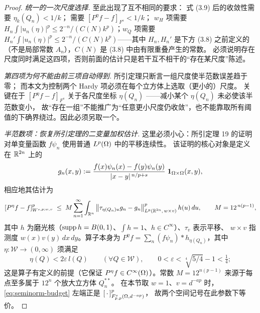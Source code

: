 \begin{proof}
\emph{统一的一次尺度选择.}
至此出现了互不相同的要求：
式 (3.9) 后的收敛性需要 $\eta_k(Q_n)<1/k$；
需要 $[P^{\eta}f-f]_{F^s}<1/k$；
$w_H$ 项需要 $H_n\int|u_n(\eta)|^p\le 2^{-n}/(C(N)k^{p})$；$w_Q$ 项需要 $H_n'\int|u_n(\eta)|^p\le 2^{-n}/(C(N)k^{p})$——其中 $H_n,H_n'$ 是下方 (3.8) 之前定义的（不是局部常数 $A_n$），$C(N)$ 是 (3.8) 中由有限重叠产生的常数。
必须说明存在尺度同时满足这四项，否则前面的估计只是若干互不相干的“存在某尺度”陈述。

\emph{第四项为何不能由前三项自动得到.}
所引定理只断言一组尺度使半范数误差趋于零；
而本文为控制两个 Hardy 项必须在每个立方体上选取（更小的）尺度。
关键在于 $[P^{\eta}f-f]_{F^s}$ 关于各尺度坐标 $\eta(Q_n)$ ——减小某个 $\eta(Q_n)$ 未必使该半范数变小，
故“存在一组”不能推广为“任意更小尺度仍收敛”，也不能靠取所有阈值的下确界绕过。因此必须另取一个。

\emph{半范数项：恢复所引定理的二变量加权估计.}
这里必须小心：所引定理 19 的证明对单变量函数 $f\psi_n$ 使用普通 $L^p(\Omega)$ 中的平移连续性。
该证明的核心对象是定义在 $\mathbb{R}^{2n}$ 上的
\begin{equation}\label{eq:gn-def}
  g_n(x,y):=\frac{f(x)\psi_n(x)-f(y)\psi_n(y)}{|x-y|^{\,n/p+s}}\;\mathbf 1_{\Omega\times\Omega}(x,y),
\end{equation}
相应地其估计为
\begin{equation}\label{eq:seminorm-budget}
  [P^{\eta}f-f]_{W^{s,p;w,v}}^{p}
  \;\le\;M\sum_{n=1}^{\infty}\int_{\mathbb{R}^n}
  \big\|\tau_{\eta(Q_n)u}g_n-g_n\big\|_{L^p(\mathbb{R}^{2n},\,w\times v)}^{p}\,h(u)\,du ,
  \qquad M=12^{\,n(p-1)},
\end{equation}
其中 $h$ 为磨光核（$\operatorname{supp} h=B(0,1)$、$\int h=1$、$h\in C^\infty$）、$\tau_v$ 表示平移、
$w\times v$ 指测度 $w(x)v(y)\,dx\,dy$。算子本身为
$P^{\eta}f=\sum_{n}(f\psi_n)*h_{\eta(Q_n)}$，其中 $\eta:\mathcal W\to(0,\infty)$ 须满足
\begin{equation}\label{eq:eta-admissible}
  \eta(Q)<2\varepsilon\,l(Q)\qquad(\forall Q\in\mathcal W),\qquad 0<\varepsilon<\sqrt[4]{5/4}-1<\tfrac14 ;
\end{equation}
这是算子有定义的前提（它保证 $P^\eta f\in C^\infty(\Omega)$）。常数 $M=12^{n(p-1)}$ 来源于每点至多属于
$12^n$ 个放大立方体 $Q_n^{**}$。
在本节取 $w=1$、$v=d^{-ap}$ 时，\eqref{eq:seminorm-budget} 左端正是 $[\,\cdot\,]_{F^s_{p,p}(\Omega,d^{-ap})}^{p}$，
故两个空间记号在此参数下等价。


\end{proof}
